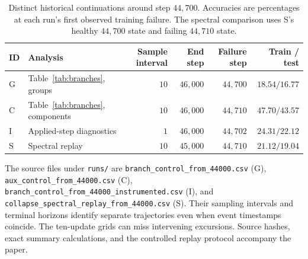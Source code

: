 \begin{table}[htbp]
\centering\small
\caption{Distinct historical continuations around step $44{,}700$. Accuracies are percentages at each run's first observed training failure. The spectral comparison uses S's healthy $44{,}700$ state and failing $44{,}710$ state.}
\label{tab:event-provenance}
\begin{tabular}{llrrrr}
\toprule
ID & Analysis & Sample interval & End step & Failure step & Train / test \\
\midrule
G & Table~\ref{tab:branches}, groups & $10$ & $46{,}000$ & $44{,}700$ & $18.54 / 16.77$ \\
C & Table~\ref{tab:branches}, components & $10$ & $46{,}000$ & $44{,}710$ & $47.70 / 43.57$ \\
I & Applied-step diagnostics & $1$ & $46{,}000$ & $44{,}702$ & $24.31 / 22.12$ \\
S & Spectral replay & $10$ & $45{,}000$ & $44{,}710$ & $21.12 / 19.04$ \\
\bottomrule
\end{tabular}
\end{table}

The source files under \texttt{runs/} are \nolinkurl{branch_control_from_44000.csv} (G), \nolinkurl{aux_control_from_44000.csv} (C), \nolinkurl{branch_control_from_44000_instrumented.csv} (I), and \nolinkurl{collapse_spectral_replay_from_44000.csv} (S). Their sampling intervals and terminal horizons identify separate trajectories even when event timestamps coincide. The ten-update grids can miss intervening excursions. Source hashes, exact summary calculations, and the controlled replay protocol accompany the paper.
